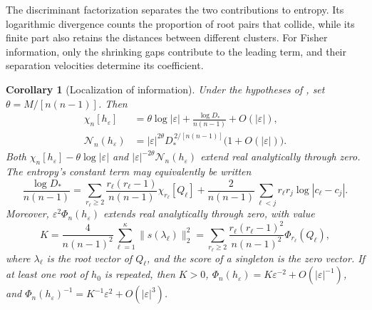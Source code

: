 \documentclass[12pt,reqno]{amsart}
\newtheorem{corollary}[corollary]{Corollary}
\theoremstyle{definition}
\theoremstyle{remark}
\newcommand{\cN}{\mathcal N}
\newcommand{\eps}{\varepsilon}
\begin{document}
The discriminant factorization separates the two contributions to entropy. Its logarithmic divergence counts the proportion of root pairs that collide, while its finite part also retains the distances between different clusters. For Fisher information, only the shrinking gaps contribute to the leading term, and their separation velocities determine its coefficient.

\begin{corollary}[Localization of information]
\label{cor:collision-information}
Under the hypotheses of , set
\(\theta=M/[n(n-1)]\).  Then
\begin{align}
 \chi_n[h_\eps]
   &=\theta\log|\eps|+
       \frac{\log D_*}{n(n-1)}+O(|\eps|),
       \label{eq:collision-entropy-localization}\\
 \cN_n(h_\eps)
   &=|\eps|^{2\theta}D_*^{\,2/[n(n-1)]}
           \bigl(1+O(|\eps|)\bigr).
       \label{eq:collision-entropy-power-localization}
\end{align}
Both \(\chi_n[h_\eps]-\theta\log|\eps|\) and
\(|\eps|^{-2\theta}\cN_n(h_\eps)\) extend real analytically
through zero.  The entropy's constant term may equivalently be written
\begin{equation}\label{eq:collision-entropy-constant}
 \frac{\log D_*}{n(n-1)}
 =\sum_{r_\ell\geq2}\frac{r_\ell(r_\ell-1)}{n(n-1)}
                      \chi_{r_\ell}[Q_\ell]
   +\frac{2}{n(n-1)}
       \sum_{\ell<j}r_\ell r_j\log|c_\ell-c_j|.
\end{equation}
Moreover, \(\eps^2\Phi_n(h_\eps)\) extends real analytically
through zero, with value
\begin{equation}\label{eq:collision-fisher-localization}
 K=\frac{4}{n(n-1)^2}
       \sum_{\ell=1}^{\kappa}\|s(\lambda_\ell)\|_2^2
   =\sum_{r_\ell\geq2}
       \frac{r_\ell(r_\ell-1)^2}{n(n-1)^2}
                           \Phi_{r_\ell}(Q_\ell),
\end{equation}
where \(\lambda_\ell\) is the root vector of \(Q_\ell\), and the
score of a singleton is the zero vector.  If at least one root
of \(h_0\) is repeated, then \(K>0\),
\(\Phi_n(h_\eps)=K\eps^{-2}+O(|\eps|^{-1})\), and
\(\Phi_n(h_\eps)^{-1}=K^{-1}\eps^2+O(|\eps|^3)\).
\end{corollary}
\end{document}

